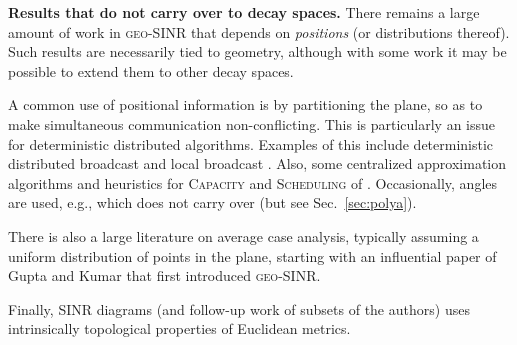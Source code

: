 \documentclass[11pt]{amsart}
\newcommand{\prob}[1]{\textsc{#1}}
\newcommand{\Capacity}{\prob{Capacity}}
\newcommand{\capacity}{\Capacity}
\newcommand{\Scheduling}{\prob{Scheduling}}
\newcommand{\scheduling}{\Scheduling}
\newcommand{\geomodel}{\textsc{geo-SINR}}
\newcommand{\mypara}[1]{\smallskip\noindent\textbf{#1.}}  \newcommand{\tightpara}[1]{\noindent\textbf{#1.}}  \newcommand{\inddim}{D}
\begin{document}
\mypara{Results that do not carry over to decay spaces}
There remains a large amount of work in {\geomodel} that depends on
\emph{positions} (or distributions thereof). 
Such results are necessarily tied to geometry, although with some work
it may be possible to extend them to other decay spaces.

A common use of positional information is by partitioning the
plane, so as to make simultaneous communication non-conflicting. This
is particularly an issue for deterministic distributed algorithms.
Examples of this include deterministic distributed broadcast
\cite{JurdzinskiKRS13, JurdzinskiKS13FCT} and local broadcast
\cite{JurdzinskiK12, FuchsW13}.  Also, some centralized approximation
algorithms and heuristics for {\capacity} and {\scheduling} of
\cite{gouss2007, DBLP:journals/corr/abs-1208-0627}.  
Occasionally, angles are used, e.g.\cite{GHWW09}, which does not carry over
(but see Sec.~\ref{sec:polya}).

There is also a large literature on average case analysis, typically
assuming a uniform distribution of points in the plane, starting with
an influential paper of Gupta and Kumar \cite{kumar00} that first
introduced {\geomodel}.

Finally, SINR diagrams \cite{AvinEKLPR12} (and follow-up work of
subsets of the authors) uses intrinsically topological properties of Euclidean
metrics. 


\iffalse The algorithms/analysis must be adaptable to different values than
hold only in the plane, e.g., the path loss term .
We know of no result to date for which this cannot be 
attained. 

\textbf{Issues in doing this formally:}
\begin{itemize}
  \item Allowed: Distances and triangular inequality
  \item Disallowed: positions, angles, packings. (see Fading section)
  \item May need: assume symmetry; knowledge of parameter upper bounds
  \item Parameters must adapt to the fading space:  -->
    , with inequality rather than equality.
  \item Algorithms modified to use decay (instead of distances), 
    but can do so indirectly through the distance function . Thus, no change.
  \item Idea: In the end, the essential matters is whether a
    transmission is successful or not. This can be computed equally
    well depending on decays.
\end{itemize}
\fi
\end{document}
